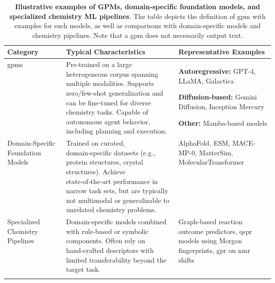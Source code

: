 \begin{table}[!h]
    \centering
    \caption{\textbf{Illustrative examples of GPMs, domain‑specific foundation models, and specialized chemistry ML pipelines}. The table depicts the definition of \gls{gpm} with examples for such models, as well as comparisons with domain-specific models and chemistry pipelines. Note that a \gls{gpm} does not necessarily output text.}
    \label{tab:gpm}
    \begin{tabularx}{\linewidth}{@{}p{0.22\linewidth} p{0.42\linewidth} X@{}}
        \toprule
        \textbf{Category} & \textbf{Typical Characteristics} & \textbf{Representative Examples} \\
        \midrule
        \addlinespace[0.3em]
        
        \glspl{gpm} &
        Pre‑trained on a large heterogeneous corpus spanning multiple modalities. Supports zero/few‑shot generalization and can be fine‑tuned for diverse chemistry tasks. Capable of autonomous agent behavior, including planning and execution. &
        \textbf{Autoregressive:} GPT‑4,\autocite{openai2023gpt04} LLaMA,\autocite{grattafiori2024llama} Galactica\autocite{taylor2022galactica}
        
        \textbf{Diffusion-based:} Gemini Diffusion,\autocite{deepmind_geminidiffusion_2025} Inception Mercury\autocite{inceptionlabs2025mercury0}
        
        \textbf{Other:} Mamba-based\autocite{gu2023mamba0} models \\
        
        \addlinespace[0.8em]
        \midrule
        \addlinespace[0.3em]
        
        Domain‑Specific Foundation Models &
        Trained on curated, domain‑specific datasets (e.g., protein structures, crystal structures). Achieve state‑of‑the‑art performance in narrow task sets, but are typically not multimodal or generalizable to unrelated chemistry problems. &
        AlphaFold,\autocite{AlphaFold2021} ESM,\autocite{lin2022language} MACE-MP-0\autocite{batatia2023foundation}, MatterSim\autocite{yang2024mattersim}, MolecularTransformer\autocite{schwaller2019molecular} \\
        
        \addlinespace[0.8em]
        \midrule
        \addlinespace[0.3em]
        
        Specialized Chemistry Pipelines &
        Domain‑specific models combined with rule‑based or symbolic components. Often rely on hand‑crafted descriptors with limited transferability beyond the target task. &
        Graph‑based reaction outcome predictors,  \gls{qspr} models using Morgan fingerprints, \gls{gpr} on \gls{nmr} shifts \\
        
        \addlinespace[0.3em]
        \bottomrule
    \end{tabularx}
\end{table}

